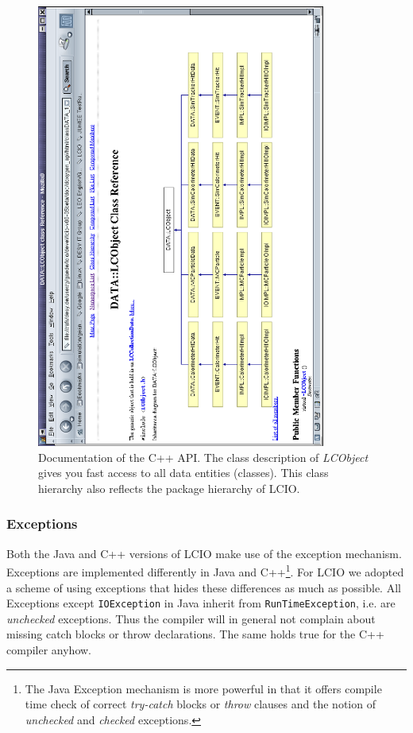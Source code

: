 \documentclass[twoside]{article}
\begin{document}
\begin{figure}
\includegraphics[width=95mm, angle=-90]{cpp_api.eps}
\caption{Documentation of the C++ API. The class description of {\em LCObject} gives you fast access 
to all data entities (classes). This class hierarchy also reflects the package hierarchy of LCIO.
\label{fig_cpp_api}}
\end{figure}

\subsubsection{Exceptions} \label{exceptions}
Both the Java and C++ versions of LCIO make use of the exception mechanism. Exceptions are 
implemented differently in Java and C++\footnote{The Java Exception mechanism is more powerful 
in that it offers compile time check of correct {\em try-catch} blocks or {\em throw} clauses 
and the notion of {\em unchecked} and {\em checked} exceptions.}. 
For LCIO we adopted a scheme of using exceptions that 
hides these differences as much as possible. All Exceptions except \verb$IOException$ in Java inherit 
from \verb$RunTimeException$, i.e. are {\em unchecked} exceptions. Thus the compiler will in general 
not complain about missing catch blocks or throw declarations. The same holds true for the C++ compiler 
anyhow.
\end{document}
